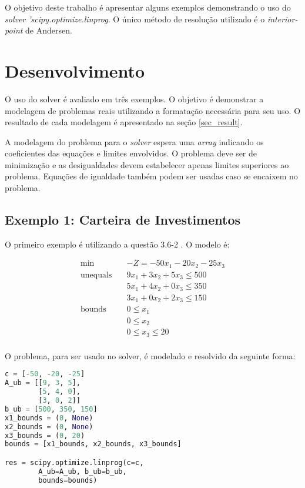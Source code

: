 \documentclass[conference,compsoc]{IEEEtran}
\begin{document}
O objetivo deste trabalho é apresentar alguns exemplos demonstrando o uso do \textit{solver 'scipy.optimize.linprog}. O único método de resolução utilizado é o \textit{interior-point} de Andersen.

\section{Desenvolvimento} \label{sec_des}

O uso do solver é avaliado em três exemplos. O objetivo é demonstrar a modelagem de problemas reais utilizando a formatação necessária para seu uso. O resultado de cada modelagem é apresentado na seção \ref{sec_result}.

A modelagem do problema para o \textit{solver} espera uma \textit{array} indicando os coeficientes das equações e limites envolvidos. O problema deve ser de minimização e as desigualdades devem estabelecer apenas limites superiores ao problema. Equações de igualdade também podem ser usadas caso se encaixem no problema.

\subsection{Exemplo 1: Carteira de Investimentos} \label{sec_ex1}

O primeiro exemplo é utilizando a questão 3.6-2 \cite{livro}. O modelo é:

\begin{equation}
\begin{aligned}
\min \quad & -Z = -50x_1 - 20x_2 - 25x_3\\
\textrm{unequals} \quad & 9x_1 + 3x_2 + 5x_3 \leq 500\\
  &5x_1 + 4x_2 + 0x_3 \leq 350\\
  &3x_1 + 0x_2 + 2x_3 \leq 150\\
\textrm{bounds} \quad & 0 \leq x_1 \\
  &0 \leq x_2 \\
  &0 \leq x_3 \leq 20 \\
\end{aligned}
\end{equation}

O problema, para ser usado no solver, é modelado e resolvido da seguinte forma:

\begin{lstlisting}[language=Python]
c = [-50, -20, -25]
A_ub = [[9, 3, 5],
        [5, 4, 0],
        [3, 0, 2]]
b_ub = [500, 350, 150]
x1_bounds = (0, None)
x2_bounds = (0, None)
x3_bounds = (0, 20)
bounds = [x1_bounds, x2_bounds, x3_bounds]

res = scipy.optimize.linprog(c=c,
        A_ub=A_ub, b_ub=b_ub,
        bounds=bounds)
\end{lstlisting}
\end{document}
